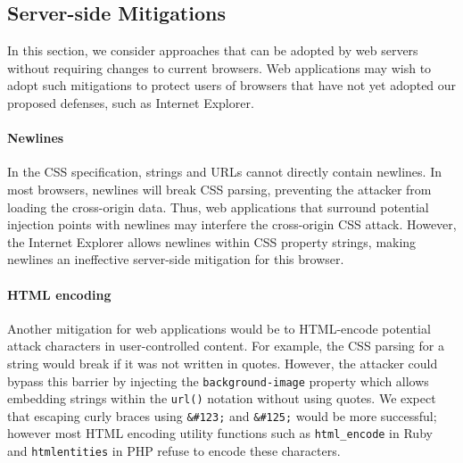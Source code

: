 \documentclass{acm_proc_article-sp}
\begin{document}

\subsection{Server-side Mitigations}
In this section, we consider approaches that can be adopted by web servers
without requiring changes to current browsers. Web applications may wish to
adopt such mitigations to protect users of browsers that have not yet adopted
our proposed defenses, such as Internet Explorer.

\paragraph{Newlines}
In the CSS specification, strings and URLs cannot directly contain newlines.
In most browsers, newlines will break CSS parsing, preventing the attacker from loading the cross-origin data.
Thus, web applications that surround potential injection points with
newlines may interfere the cross-origin CSS attack.
However, the Internet Explorer allows newlines within CSS
property strings, making newlines an ineffective server-side mitigation for this browser.

\paragraph{HTML encoding}
Another mitigation for web applications would be to HTML-encode potential attack characters in user-controlled content. For example, the CSS parsing for a string would break if it was not written in quotes. However, the attacker could bypass this barrier by injecting the \texttt{background-image} property which allows embedding strings within the \texttt{url()} notation without using quotes. We expect that escaping curly braces using \verb|&#123;| and \verb|&#125;| would be more successful; however most HTML encoding utility functions such as \verb|html_encode| in Ruby and \verb|htmlentities| in PHP refuse to encode these characters.
\end{document}

